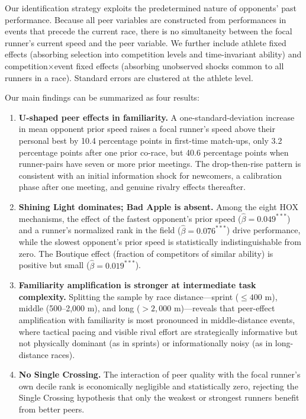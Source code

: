 \documentclass[12pt]{article}
\theoremstyle{definition}
\theoremstyle{remark}
\begin{document}
Our identification strategy exploits the predetermined nature of opponents'
past performance.
Because all peer variables are constructed from performances in events that
precede the current race, there is no simultaneity between the focal runner's
current speed and the peer variable.
We further include athlete fixed effects (absorbing selection into competition
levels and time-invariant ability) and competition$\times$event fixed effects
(absorbing unobserved shocks common to all runners in a race).
Standard errors are clustered at the athlete level.

Our main findings can be summarized as four results:

\begin{enumerate}[leftmargin=0.5in, label=\textit{Result \arabic*.}]

\item \textbf{U-shaped peer effects in familiarity.}
A one-standard-deviation increase in mean opponent prior speed raises a focal
runner's speed above their personal best by 10.4 percentage points in first-time
match-ups, only 3.2 percentage points after one prior co-race, but 40.6 percentage
points when runner-pairs have seven or more prior meetings.
The drop-then-rise pattern is consistent with an initial information shock for
newcomers, a calibration phase after one meeting, and genuine rivalry effects
thereafter.

\item \textbf{Shining Light dominates; Bad Apple is absent.}
Among the eight HOX mechanisms, the effect of the fastest opponent's prior speed
($\hat\beta = 0.049^{***}$) and a runner's normalized rank in the field
($\hat\beta = 0.076^{***}$) drive performance, while the slowest opponent's
prior speed is statistically indistinguishable from zero.
The Boutique effect (fraction of competitors of similar ability) is positive
but small ($\hat\beta = 0.019^{***}$).

\item \textbf{Familiarity amplification is stronger at intermediate task complexity.}
Splitting the sample by race distance---sprint ($\le 400$ m), middle (500--2{,}000 m),
and long ($> 2{,}000$ m)---reveals that peer-effect amplification with familiarity
is most pronounced in middle-distance events, where tactical pacing and visible
rival effort are strategically informative but not physically dominant (as in
sprints) or informationally noisy (as in long-distance races).

\item \textbf{No Single Crossing.}
The interaction of peer quality with the focal runner's own decile rank is
economically negligible and statistically zero, rejecting the Single Crossing
hypothesis that only the weakest or strongest runners benefit from better peers.

\end{enumerate}
\end{document}
